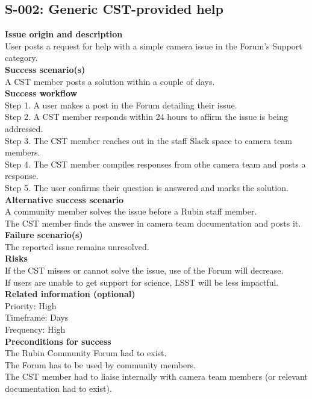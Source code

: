 \subsection{S-002: Generic CST-provided help}

\textbf {Issue origin and description} \\
User posts a request for help with a simple camera issue in the Forum's Support category. \\

\textbf {Success scenario(s)} \\
A CST member posts a solution within a couple of days. \\

\textbf {Success workflow} \\
Step 1. A user makes a post in the Forum detailing their issue. \\
Step 2. A CST member responds within 24 hours to affirm the issue is being addressed. \\
Step 3. The CST member reaches out in the staff Slack space to camera team members. \\
Step 4. The CST member compiles responses from othe camera team and posts a response. \\
Step 5. The user confirms their question is answered and marks the solution. \\

\textbf {Alternative success scenario} \\
A community member solves the issue before a Rubin staff member. \\
The CST member finds the answer in camera team documentation and posts it. \\

\textbf {Failure scenario(s)} \\
The reported issue remains unresolved. \\

\textbf {Risks}\\
If the CST misses or cannot solve the issue, use of the Forum will decrease. \\
If users are unable to get support for science, LSST will be less impactful. \\

\textbf {Related information (optional)} \\
Priority: High \\
Timeframe: Days \\
Frequency: High \\

\textbf {Preconditions for success}\\
The Rubin Community Forum had to exist. \\
The Forum has to be used by community members. \\
The CST member had to liaise internally with camera team members (or relevant documentation had to exist). \\
